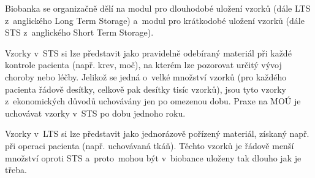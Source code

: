 \documentclass[11pt, final, oneside]{fithesis2}
\begin{document}
Biobanka se organizačně dělí na modul pro dlouhodobé uložení vzorků (dále LTS z~anglického Long Term Storage) a~modul pro krátkodobé uložení vzorků (dále STS z~anglického Short Term Storage). 

Vzorky v~STS si lze představit jako pravidelně odebíraný materiál při každé kontrole pacienta (např. krev, moč), na kterém lze pozorovat určitý vývoj choroby nebo léčby. Jelikož se jedná o~velké množství vzorků (pro každého pacienta řádově desítky, celkově pak desítky tisíc vzorků), jsou tyto vzorky z~ekonomických důvodů uchovávány jen po omezenou dobu. Praxe na MOÚ je uchovávat vzorky v~STS po dobu jednoho roku.

Vzorky v~LTS si lze představit jako jednorázově pořízený materiál, získaný např. při operaci pacienta (např. uchovávaná tkáň). 
Těchto vzorků je řádově menší množství oproti STS a~proto~mohou být v~biobance uloženy tak dlouho jak je třeba.
\end{document}
